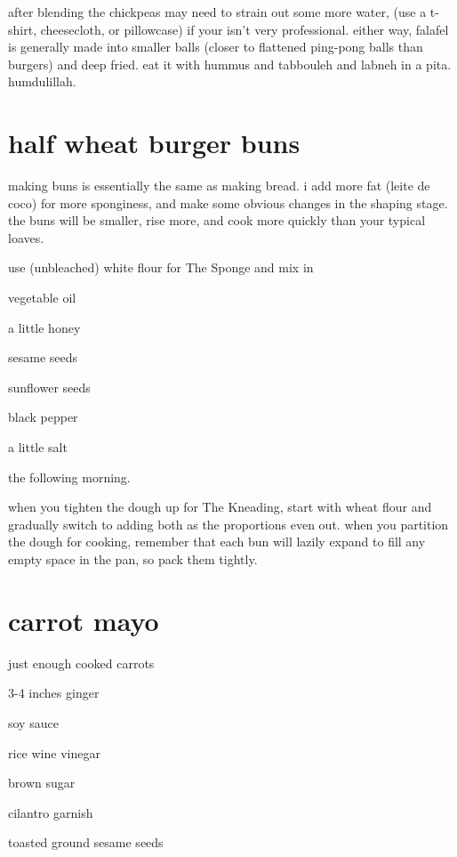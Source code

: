 after blending the chickpeas may need to strain out some more water, (use a 
t-shirt, cheesecloth, or pillowcase) if your  isn't very professional. 
either way, falafel is generally made into smaller balls (closer to flattened 
ping-pong balls than burgers) and deep fried. eat it with hummus and tabbouleh 
and \gls{labneh} in a pita. 
\gls{humdulillah}.

\section{half wheat burger buns}

making buns is essentially the same as making bread. i add more fat (leite de 
coco) for more sponginess, and make some obvious changes in the shaping stage. 
the buns will be smaller, rise more, and cook more quickly than your typical 
loaves.

use (unbleached) white flour for The Sponge and mix in

\begin{ingredients}
  \item vegetable oil
  \item a little honey
  \item sesame seeds
  \item sunflower seeds
  \item black pepper
  \item a little salt
\end{ingredients}

the following morning.

when you tighten the dough up for The Kneading, start with wheat flour and 
gradually switch to adding both as the proportions even out.
when you partition the dough for cooking, remember that each bun will lazily 
expand to fill any empty space in the pan, so pack them tightly.

\section{carrot mayo}

\begin{ingredients}
  \item just enough cooked carrots
  \item 3-4 inches ginger
  \item soy sauce
  \item rice wine vinegar
  \item brown sugar
  \item cilantro garnish
  \item toasted ground sesame seeds
\end{ingredients}


